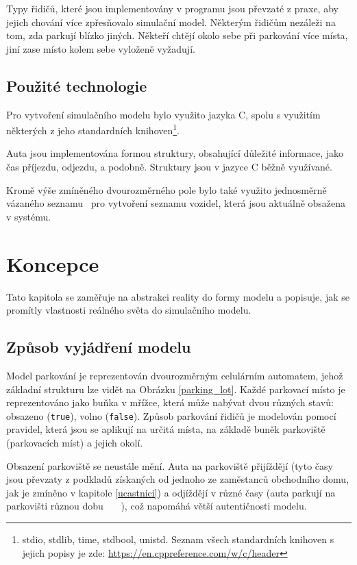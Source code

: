 \documentclass[11pt, a4paper]{article}
\begin{document}
Typy řidičů, které jsou implementovány v programu jsou převzaté z praxe, aby jejich chování více zpřes\-ňo\-va\-lo simulační model. Některým řidičům nezáleži na tom, zda parkují blízko jiných. Někteří chtějí okolo sebe při parkování více místa, jiní zase místo kolem sebe vyloženě vyžadují.

\subsection{Použité technologie}

Pro vytvoření simulačního modelu bylo využito jazyka C, spolu s využitím některých z jeho standardních knihoven\footnote{stdio, stdlib, time, stdbool, unistd. Seznam všech standardních knihoven s jejich popisy je zde: \url{https://en.cppreference.com/w/c/header}}.

Auta jsou implementována formou struktury, obsahující důležité informace, jako čas příjezdu, odjezdu, a podobně. Struktury jsou v jazyce C běžně využívané.

Kromě výše zmíněného dvourozměrného pole bylo také využito jednosměrně vázaného seznamu~\cite{pinkikrjad_2023} pro vytvoření seznamu vozidel, která jsou aktuálně obsažena v systému.

\section{Koncepce}

Tato kapitola se zaměřuje na abstrakci reality do formy modelu a popisuje, jak se promítly vlastnosti reálného světa do simulačního modelu.

\subsection{Způsob vyjádření modelu}

Model parkování je reprezentován dvourozměrným celulárním automatem, jehož základní strukturu lze vidět na Obrázku \ref{parking_lot}. Každé parkovací místo je reprezentováno jako buňka v mřížce, která může nabývat dvou různých stavů: obsazeno (\texttt{true}), volno (\texttt{false}). Způsob parkování řidičů je modelován pomocí pravidel, která jsou se aplikují na určitá místa, na základě buněk parkoviště (parkovacích míst) a jejich okolí.

Obsazení parkoviště se neustále mění. Auta na parkoviště přijíždějí (tyto časy jsou převzaty z podkladů získaných od jednoho ze zaměstanců obchodního domu, jak je zmíněno v kapitole \ref{ucastnici}) a odjíždějí v různé časy (auta parkují na parkovišti různou dobu ~\cite{Arndt_Gronmo_1977}~\cite{Bawa_Sinha_Kant_2019}~\cite{Rodgers_2023}), což napomáhá větší autentičnosti modelu.
\end{document}
